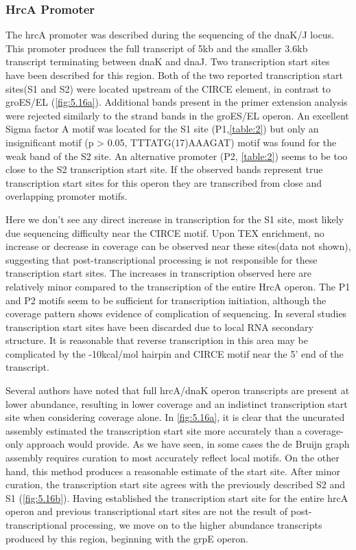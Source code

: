 \subsubsection{HrcA Promoter}
The hrcA promoter was described during the sequencing of the dnaK/J locus\cite{80}. This promoter produces the full transcript of 5kb and the smaller 3.6kb transcript terminating between dnaK and dnaJ. Two transcription start sites have been described for this region\cite{80}. Both of the two reported transcription start sites(S1 and S2) were located upstream of the CIRCE element, in contrast to groES/EL (\ref{fig:5.16a}). Additional bands present in the primer extension analysis were rejected similarly to the strand bands in the groES/EL operon. An excellent Sigma factor A motif was located for the S1 site (P1,\ref{table:2}) but only an insignificant motif (p > 0.05, TTTATG(17)AAAGAT) motif was found for the weak band of the S2 site. An alternative promoter (P2, \ref{table:2}) seems to be too close to the S2 transcription start site. If the observed bands represent true transcription start sites for this operon they are transcribed from close and overlapping promoter motifs.

Here we don't see any direct increase in transcription for the S1 site, most likely due sequencing difficulty near the CIRCE motif. Upon TEX enrichment, no increase or decrease in coverage can be observed near these sites(data not shown), suggesting that post-transcriptional processing is not responsible for these transcription start sites. The increases in transcription observed here are relatively minor compared to the transcription of the entire HrcA operon. The P1 and P2 motifs seem to be sufficient for transcription initiation, although the coverage pattern shows evidence of complication of sequencing. In several studies\cite{76,80} transcription start sites have been discarded due to local RNA secondary structure. It is reasonable that reverse transcription in this area may be complicated by the -10kcal/mol hairpin and CIRCE motif near the 5' end of the transcript. 

Several authors have noted that full hrcA/dnaK operon transcripts are present at lower abundance\cite{80,81}, resulting in lower coverage and an indistinct transcription start site when considering coverage alone. In \ref{fig:5.16a}, it is clear that the uncurated assembly estimated the transcription start site more accurately than a coverage-only approach would provide. As we have seen, in some cases the de Bruijn graph assembly requires curation to most accurately reflect local motifs. On the other hand, this method produces a reasonable estimate of the start site. After minor curation, the transcription start site agrees with the previously described\cite{79} S2 and S1 (\ref{fig:5.16b}). Having established the transcription start site for the entire hrcA operon and previous transcriptional start sites are not the result of post-transcriptional processing, we move on to the higher abundance transcripts produced by this region, beginning with the grpE operon.

